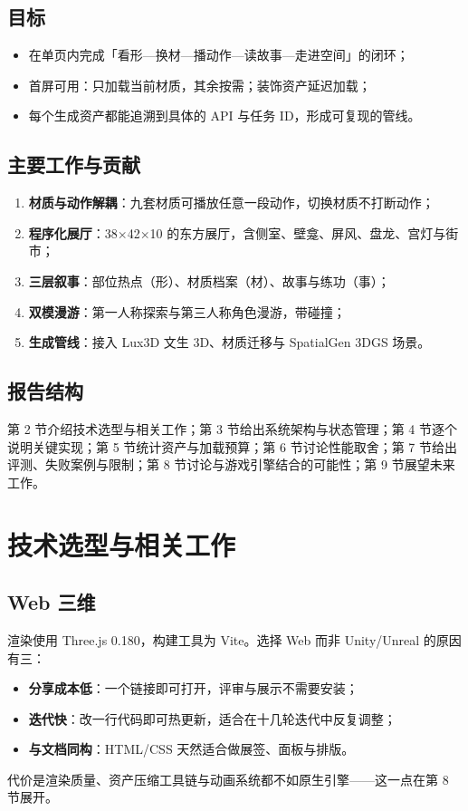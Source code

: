 \documentclass[UTF8,a4paper,11pt]{ctexart}
\begin{document}
\subsection{目标}
\begin{itemize}[itemsep=2pt]
  \item 在单页内完成「看形—换材—播动作—读故事—走进空间」的闭环；
  \item 首屏可用：只加载当前材质，其余按需；装饰资产延迟加载；
  \item 每个生成资产都能追溯到具体的 API 与任务 ID，形成可复现的管线。
\end{itemize}

\subsection{主要工作与贡献}
\begin{enumerate}[itemsep=2pt]
  \item \textbf{材质与动作解耦}：九套材质可播放任意一段动作，切换材质不打断动作；
  \item \textbf{程序化展厅}：38$\times$42$\times$10 的东方展厅，含侧室、壁龛、屏风、盘龙、宫灯与街市；
  \item \textbf{三层叙事}：部位热点（形）、材质档案（材）、故事与练功（事）；
  \item \textbf{双模漫游}：第一人称探索与第三人称角色漫游，带碰撞；
  \item \textbf{生成管线}：接入 Lux3D 文生 3D、材质迁移与 SpatialGen 3DGS 场景。
\end{enumerate}

\subsection{报告结构}
第 2 节介绍技术选型与相关工作；第 3 节给出系统架构与状态管理；第 4 节逐个说明关键实现；第 5 节统计资产与加载预算；第 6 节讨论性能取舍；第 7 节给出评测、失败案例与限制；第 8 节讨论与游戏引擎结合的可能性；第 9 节展望未来工作。

\section{技术选型与相关工作}

\subsection{Web 三维}
渲染使用 Three.js 0.180，构建工具为 Vite。选择 Web 而非 Unity/Unreal 的原因有三：
\begin{itemize}[itemsep=2pt]
  \item \textbf{分享成本低}：一个链接即可打开，评审与展示不需要安装；
  \item \textbf{迭代快}：改一行代码即可热更新，适合在十几轮迭代中反复调整；
  \item \textbf{与文档同构}：HTML/CSS 天然适合做展签、面板与排版。
\end{itemize}
代价是渲染质量、资产压缩工具链与动画系统都不如原生引擎——这一点在第 8 节展开。
\end{document}
